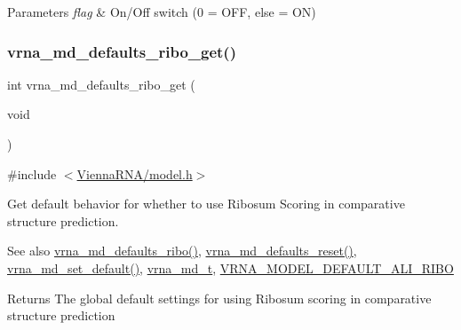 \begin{DoxyParams}{Parameters}
{\em flag} & On/\+Off switch (0 = O\+FF, else = ON) \\
\hline
\end{DoxyParams}
\mbox{\label{group__model__details_ga169027f0c0561ea7d87b655e4b336bfc}} 
\subsubsection{\texorpdfstring{vrna\_md\_defaults\_ribo\_get()}{vrna\_md\_defaults\_ribo\_get()}}
{\footnotesize\ttfamily int vrna\+\_\+md\+\_\+defaults\+\_\+ribo\+\_\+get (\begin{DoxyParamCaption}\item[{void}]{ }\end{DoxyParamCaption})}



{\ttfamily \#include $<$\mbox{\hyperlink{model_8h}{Vienna\+R\+N\+A/model.\+h}}$>$}



Get default behavior for whether to use Ribosum Scoring in comparative structure prediction. 

\begin{DoxySeeAlso}{See also}
\mbox{\hyperlink{group__model__details_ga937c45e1d06fd6168730a9b08d130be3}{vrna\+\_\+md\+\_\+defaults\+\_\+ribo()}}, \mbox{\hyperlink{group__model__details_ga70834424cf804d149937de89f80ceb45}{vrna\+\_\+md\+\_\+defaults\+\_\+reset()}}, \mbox{\hyperlink{group__model__details_ga8ac6ff84936282436f822644bf841f66}{vrna\+\_\+md\+\_\+set\+\_\+default()}}, \mbox{\hyperlink{group__model__details_ga1f8a10e12a0a1915f2a4eff0b28ea17c}{vrna\+\_\+md\+\_\+t}}, \mbox{\hyperlink{group__model__details_ga64b3ab65a9ca42d4ad1d05e193083147}{V\+R\+N\+A\+\_\+\+M\+O\+D\+E\+L\+\_\+\+D\+E\+F\+A\+U\+L\+T\+\_\+\+A\+L\+I\+\_\+\+R\+I\+BO}} 
\end{DoxySeeAlso}
\begin{DoxyReturn}{Returns}
The global default settings for using Ribosum scoring in comparative structure prediction 
\end{DoxyReturn}
\mbox{\label{group__model__details_gad3a3f40baafd91a6ce80a91a68e20053}} 

